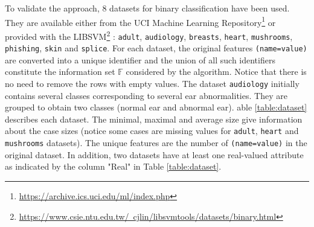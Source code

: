 \documentclass[sigconf,edbt]{acmart-edbt-workshops}
\begin{document}
To validate the approach, 8 datasets for binary classification have been used. They are available either from the UCI Machine Learning Repository\footnote{\href{https://archive.ics.uci.edu/ml/index.php}{https://archive.ics.uci.edu/ml/index.php}}
 or provided with the LIBSVM\footnote{\href{https://www.csie.ntu.edu.tw/~cjlin/libsvmtools/datasets/binary.html}{https://www.csie.ntu.edu.tw/~cjlin/libsvmtools/datasets/binary.html}}
 : \texttt{adult}, \texttt{audiology}, \texttt{breasts}, \texttt{heart}, \texttt{mushrooms}, \texttt{phishing}, \texttt{skin} and \texttt{splice}. For each dataset, the original features \texttt{(name=value)} are converted into a unique identifier and the union of all such identifiers constitute the information set $\mathbb{F}$ considered by the algorithm. Notice that there is no need to remove the rows with empty values. The dataset \texttt{audiology} initially contains several classes corresponding to several ear abnormalities. They are grouped to obtain two classes (normal ear and abnormal ear). able \ref{table:dataset} describes each dataset. The minimal, maximal and average size give information about the case sizes (notice some cases are missing values for \texttt{adult}, \texttt{heart} and \texttt{mushrooms} datasets). The unique features are the number of \texttt{(name=value)} in the original dataset. In addition, two datasets have at least one real-valued attribute as indicated by the column "Real" in Table \ref{table:dataset}. 
\end{document}
